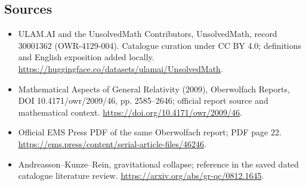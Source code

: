 \documentclass[11pt]{article}
\begin{document}
\subsection{Sources}
\begin{itemize}
\item[\hypertarget{source:30001362:1}{S1}] ULAM.AI and the UnsolvedMath Contributors, UnsolvedMath, record 30001362 (OWR-4129-004). Catalogue curation under CC BY 4.0; definitions and English exposition added locally.
\url{https://huggingface.co/datasets/ulamai/UnsolvedMath}.
\item[\hypertarget{source:30001362:2}{S2}] Mathematical Aspects of General Relativity (2009), Oberwolfach Reports, DOI 10.4171/owr/2009/46, pp. 2585--2646; official report source and mathematical context.
\url{https://doi.org/10.4171/owr/2009/46}.
\item[\hypertarget{source:30001362:3}{S3}] Official EMS Press PDF of the same Oberwolfach report; PDF page 22.
\url{https://ems.press/content/serial-article-files/46246}.
\item[\hypertarget{source:30001362:4}{S4}] Andreasson--Kunze--Rein, gravitational collapse; reference in the saved dated catalogue literature review.
\url{https://arxiv.org/abs/gr-qc/0812.1645}.
\end{itemize}
\label{end:30001362}
\end{document}
